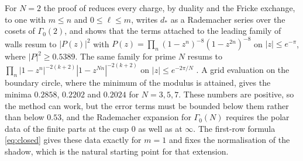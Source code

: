 \documentclass[mathematics,article,submit,pdftex,oneauthor]{Definitions/mdpi}
\numberwithin{equation}{section}
\theoremstyle{plain}
\theoremstyle{remark}
\begin{document}
For $N=2$ the proof of \cite{Bha26a} reduces every charge, by duality and the Fricke exchange, to one with $m\le n$ and $0\le\ell\le m$, writes $d_*$ as a Rademacher series over the cosets of $\Gamma_0(2)$, and shows that the terms attached to the leading family of walls resum to $|P(z)|^2$ with $P(z)=\prod_n(1-z^n)^{-8}(1-z^{2n})^{-8}$ on $|z|\le e^{-\pi}$, where $|P|^2\ge0.5389$. The same family for prime $N$ resums to $\prod_n|1-z^n|^{-2(k+2)}|1-z^{Nn}|^{-2(k+2)}$ on $|z|\le e^{-2\pi/N}$ \cite[Section~16]{Bha26a}. A grid evaluation on the boundary circle, where the minimum of the modulus is attained, gives the minima $0.2858$, $0.2202$ and $0.2024$ for $N=3,5,7$. These numbers are positive, so the method can work, but the error terms must be bounded below them rather than below $0.53$, and the Rademacher expansion for $\Gamma_0(N)$ requires the polar data of the finite parts at the cusp $0$ as well as at $\infty$. The first-row formula \eqref{eq:closed} gives these data exactly for $m=1$ and fixes the normalisation of the shadow, which is the natural starting point for that extension.

\vspace{6pt}
\end{document}

